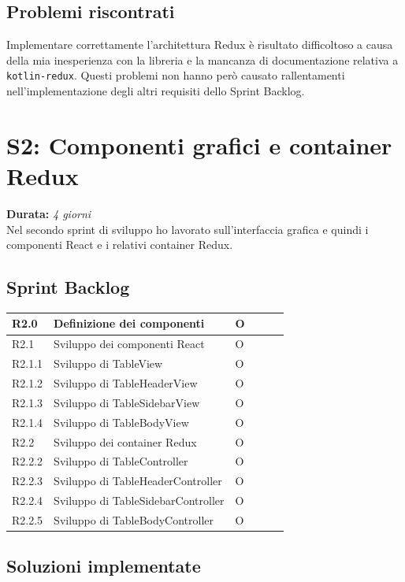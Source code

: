 \subsection{Problemi riscontrati}
Implementare correttamente l'architettura Redux è risultato difficoltoso a causa della mia inesperienza con la libreria e la mancanza di documentazione relativa a \verb|kotlin-redux|. Questi problemi non hanno però causato rallentamenti nell'implementazione degli altri requisiti dello Sprint Backlog.

\newpage

\section{S2: Componenti grafici e container Redux}
\textbf{Durata:} \textit{4 giorni} \\
Nel secondo sprint di sviluppo ho lavorato sull'interfaccia grafica e quindi i componenti React e i relativi container Redux.

\subsection{Sprint Backlog}
\begin{longtable} {
		|>{}p{10mm}| 
		|>{}p{90mm}|
		|>{}p{15mm}|
		|>{}p{15mm}|
		|>{}p{15mm}|
		>{}p{0mm}}
	\hline
R2.0   & \textbf{Definizione dei componenti} & O\\ \hline
R2.1   & Sviluppo dei componenti React 		  & O\\ \hline
R2.1.1 & Sviluppo di TableView                & O\\ \hline
R2.1.2 & Sviluppo di TableHeaderView          & O\\ \hline
R2.1.3 & Sviluppo di TableSidebarView         & O \\ \hline
R2.1.4 & Sviluppo di TableBodyView            & O\\ \hline
R2.2   & Sviluppo dei container Redux         & O  \\ \hline
R2.2.2 & Sviluppo di TableController          & O   \\ \hline
R2.2.3 & Sviluppo di TableHeaderController    & O      \\ \hline
R2.2.4 & Sviluppo di TableSidebarController   & O      \\ \hline
R2.2.5 & Sviluppo di TableBodyController      & O   \\ \hline
\end{longtable}

\subsection{Soluzioni implementate}
